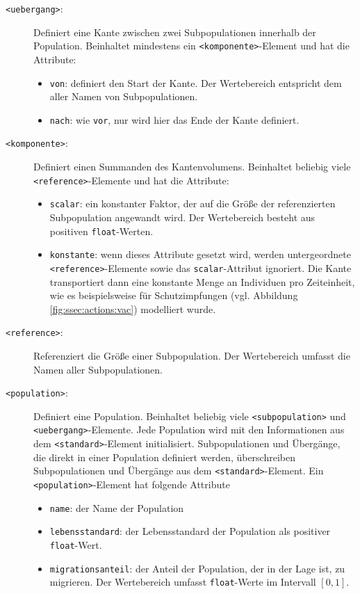 \begin{description}
\begin{itemize}
\end{itemize}
\item[\texttt{<uebergang>}:] Definiert eine Kante zwischen zwei Subpopulationen innerhalb der Population. Beinhaltet mindestens ein \texttt{<komponente>}-Element und hat die Attribute:\begin{itemize}
	\item \texttt{von}: definiert den Start der Kante. Der Wertebereich entspricht dem aller Namen von Subpopulationen.
	\item \texttt{nach}: wie \texttt{vor}, nur wird hier das Ende der Kante definiert.
\end{itemize}
\item[\texttt{<komponente>}:] Definiert einen Summanden des Kantenvolumens. Beinhaltet beliebig viele \texttt{<reference>}-Elemente und hat die Attribute:
\begin{itemize}
	\item \texttt{scalar}: ein konstanter Faktor, der auf die Größe der referenzierten Subpopulation angewandt wird. Der Wertebereich besteht aus positiven \texttt{float}-Werten.
	\item \texttt{konstante}: wenn dieses Attribute gesetzt wird, werden untergeordnete \texttt{<reference>}-Elemente sowie das \texttt{scalar}-Attribut ignoriert. Die Kante transportiert dann eine konstante Menge an Individuen pro Zeiteinheit, wie es beispielsweise für Schutzimpfungen (vgl. Abbildung \ref{fig:ssec:actions:vac}) modelliert wurde. 
\end{itemize}
\item[\texttt{<reference>}:] Referenziert die Größe einer Subpopulation. Der Wertebereich umfasst die Namen aller Subpopulationen. 
\item[\texttt{<population>}:] Definiert eine Population. Beinhaltet beliebig viele \texttt{<subpopulation>} und \texttt{<uebergang>}-Elemente. Jede Population wird mit den Informationen aus dem \texttt{<standard>}-Element initialisiert. Subpopulationen und Übergänge, die direkt in einer Population definiert werden, überschreiben Subpopulationen und Übergänge aus dem \texttt{<standard>}-Element. Ein \texttt{<population>}-Element hat folgende Attribute
\begin{itemize}
	\item \texttt{name}: der Name der Population
	\item \texttt{lebensstandard}: der Lebensstandard der Population als positiver \texttt{float}-Wert.
	\item \texttt{migrationsanteil}: der Anteil der Population, der in der Lage ist, zu migrieren. Der Wertebereich umfasst \texttt{float}-Werte im Intervall $[0,1]$.

\end{itemize}
\end{description}
